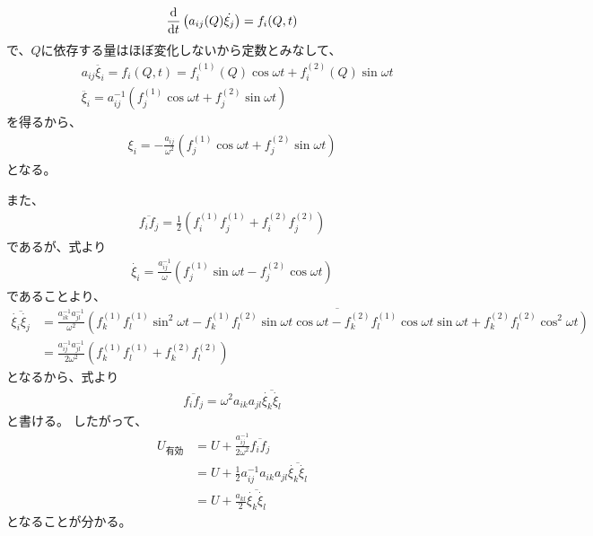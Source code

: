 \documentclass[a4paper]{jsarticle}
\newcommand{\dif}[2]{\frac{{\rm d} #1}{{\rm d} #2}}
\begin{document}
\begin{align}
	\dif{}{t} \left( a_{ij}(Q) \dot{\xi_j} \right) = f_i(Q, t)
\end{align}
で、$Q$に依存する量はほぼ変化しないから定数とみなして、
\begin{align}
	 &a_{ij} \ddot{\xi_i} = f_i (Q, t) =
	 f_i^{(1)} (Q) \cos \omega t + f_i^{(2)} (Q) \sin \omega t \\
	 &\ddot{\xi_i} = a_{ij}^{-1}
	 \left( f_j^{(1)} \cos \omega t + f_j^{(2)} \sin \omega t \right)
\end{align}
を得るから、
\begin{align}
	 \xi_i = -\frac{a_{ij}}{\omega^2}
	 \left( f_j^{(1)} \cos \omega t + f_j^{(2)} \sin \omega t \right)
	 \label{eq:xi}
\end{align}
となる。

また、
\begin{align}
	 \overline{f_i f_j} = \frac{1}{2}
	 \left( f_i^{(1)} f_j^{(1)} + f_i^{(2)} f_j^{(2)} \right)
	 \label{eq:f}
\end{align}
であるが、式より
\begin{align}
	 \dot{\xi_i} = \frac{a_{ij}^{-1}}{\omega}
	 \left( f_j^{(1)} \sin \omega t - f_j^{(2)} \cos \omega t \right)
\end{align}
であることより、
\begin{align}
	\overline{\dot{\xi_i}\dot{\xi_j}} &= \frac{a_{ik}^{-1} a_{jl}^{-1}}{\omega^2} 
	\overline{\left( f_k^{(1)} f_l^{(1)} \sin^2 \omega t
	- f_k^{(1)} f_l^{(2)} \sin \omega t \cos \omega t
	- f_k^{(2)} f_l^{(1)} \cos \omega t \sin \omega t
	+ f_k^{(2)} f_l^{(2)} \cos^2 \omega t \right)} \\
	&= \frac{a_{ij}^{-1} a_{jl}^{-1}}{2\omega^2}
	\left( f_k^{(1)} f_l^{(1)} + f_k^{(2)} f_l^{(2)} \right)
\end{align}
となるから、式より
\begin{align}
	\overline{f_i f_j} = \omega^2 a_{ik} a_{jl}
	\overline{\dot{\xi_k} \dot{\xi_l}}
\end{align}
と書ける。
したがって、
\begin{align}
	U_{\mbox{有効}} &= U + \frac{a_{ij}^{-1}}{2\omega^2} \overline{f_i f_j} \\
	&= U + \frac{1}{2} a_{ij}^{-1} a_{ik} a_{jl}
	\overline{\dot{\xi_k} \dot{\xi_l}} \\
	&= U + \frac{a_{kl}}{2} \overline{\dot{\xi_k} \dot{\xi_l}}
\end{align}
となることが分かる。
\end{document}
